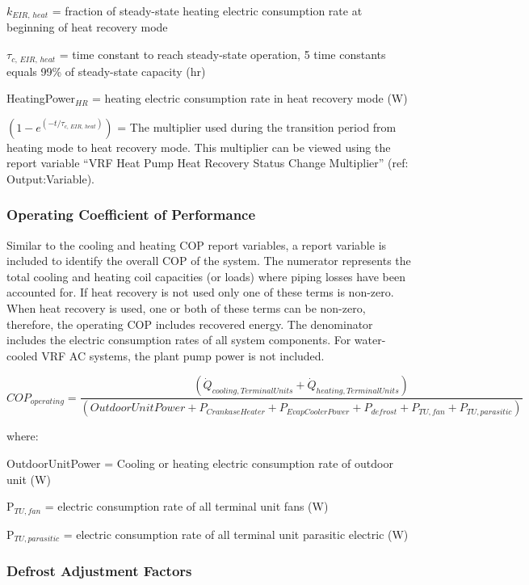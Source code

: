 \(k_{EIR,\,heat}\) = fraction of steady-state heating electric consumption rate at beginning of heat recovery mode

\(\tau_{c,\,EIR,\,heat}\) = time constant to reach steady-state operation, 5 time constants equals 99\% of steady-state capacity (hr)

HeatingPower\(_{HR}\) = heating electric consumption rate in heat recovery mode (W)

\(\left( 1 - e^{\left( -t / \tau_{c,\,EIR,\,heat} \right)} \right)\) = The multiplier used during the transition period from heating mode to heat recovery mode. This multiplier can be viewed using the report variable ``VRF Heat Pump Heat Recovery Status Change Multiplier'' (ref: Output:Variable).

\subsubsection{Operating Coefficient of Performance}\label{operating-coefficient-of-performance}

Similar to the cooling and heating COP report variables, a report variable is included to identify the overall COP of the system. The numerator represents the total cooling and heating coil capacities (or loads) where piping losses have been accounted for. If heat recovery is not used only one of these terms is non-zero. When heat recovery is used, one or both of these terms can be non-zero, therefore, the operating COP includes recovered energy. The denominator includes the electric consumption rates of all system components. For water-cooled VRF AC systems, the plant pump power is not included.

\begin{equation}
  COP_{operating} = \frac{\left( \dot{Q}_{cooling,TerminalUnits} + \dot{Q}_{heating,TerminalUnits} \right)}{\left( OutdoorUnitPower + P_{CrankaseHeater} + P_{EvapCoolerPower} + P_{defrost} + P_{TU,fan} + P_{TU,parasitic} \right)}
\end{equation}

where:

OutdoorUnitPower = Cooling or heating electric consumption rate of outdoor unit (W)

P\(_{TU,fan}\) = electric consumption rate of all terminal unit fans (W)

P\(_{TU,parasitic}\) = electric consumption rate of all terminal unit parasitic electric (W)

\subsubsection{Defrost Adjustment Factors}\label{defrost-adjustment-factors}

